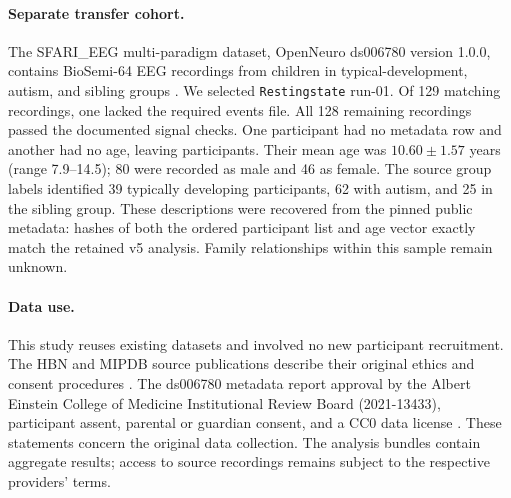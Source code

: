 \paragraph{Separate transfer cohort.}
The SFARI\_EEG multi-paradigm dataset, OpenNeuro ds006780 version 1.0.0,
contains BioSemi-64 EEG recordings from children in typical-development, autism,
and sibling groups \citep{molholmsfari}. We selected \texttt{Restingstate}
run-01. Of 129 matching recordings, one lacked the required events file.
All 128 remaining recordings passed the documented signal checks. One
participant had no metadata row and another had no age, leaving
\DsSubjectCount{} participants. Their mean age was $10.60 \pm 1.57$ years
(range 7.9--14.5); 80 were recorded as male and 46 as female. The source group
labels identified 39 typically developing participants, 62 with autism, and
25 in the sibling group. These descriptions were recovered from the pinned
public metadata: hashes of both the ordered participant list and age vector
exactly match the retained v5 analysis. Family relationships within this
sample remain unknown.

\paragraph{Data use.}
This study reuses existing datasets and involved no new participant recruitment.
The HBN and MIPDB source publications describe their original ethics and
consent procedures \citep{alexander2017hbn,langer2017mipdb}. The ds006780
metadata report approval by the Albert Einstein College of Medicine
Institutional Review Board (2021-13433), participant assent, parental or guardian
consent, and a CC0 data license \citep{molholmsfari}. These statements concern
the original data collection. The analysis bundles contain aggregate results;
access to source recordings remains subject
to the respective providers' terms.

